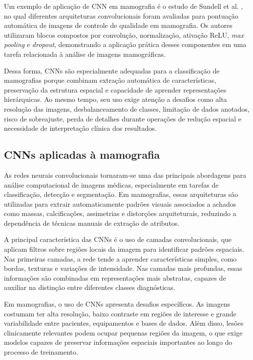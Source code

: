 \documentclass[
    12pt,
    openright,
    oneside,
    a4paper,
    english,
    brazil
]{abntex2}
\begin{document}
Um exemplo de aplicação de CNN em mamografia é o estudo de Sundell et al. \cite{sundell2022cnn}, no qual diferentes arquiteturas convolucionais foram avaliadas para pontuação automática de imagens de controle de qualidade em mamografia. Os autores utilizaram blocos compostos por convolução, normalização, ativação ReLU, \textit{max pooling} e \textit{dropout}, demonstrando a aplicação prática desses componentes em uma tarefa relacionada à análise de imagens mamográficas.

Dessa forma, CNNs são especialmente adequadas para a classificação de mamografias porque combinam extração automática de características, preservação da estrutura espacial e capacidade de aprender representações hierárquicas. Ao mesmo tempo, seu uso exige atenção a desafios como alta resolução das imagens, desbalanceamento de classes, limitação de dados anotados, risco de sobreajuste, perda de detalhes durante operações de redução espacial e necessidade de interpretação clínica dos resultados.

\subsection{CNNs aplicadas à mamografia}

As redes neurais convolucionais tornaram-se uma das principais abordagens para análise computacional de imagens médicas, especialmente em tarefas de classificação, detecção e segmentação. Em mamografias, essas arquiteturas são utilizadas para extrair automaticamente padrões visuais associados a achados como massas, calcificações, assimetrias e distorções arquiteturais, reduzindo a dependência de técnicas manuais de extração de atributos.

A principal característica das CNNs é o uso de camadas convolucionais, que aplicam filtros sobre regiões locais da imagem para identificar padrões espaciais. Nas primeiras camadas, a rede tende a aprender características simples, como bordas, texturas e variações de intensidade. Nas camadas mais profundas, essas informações são combinadas em representações mais abstratas, capazes de auxiliar na distinção entre diferentes classes diagnósticas.

Em mamografias, o uso de CNNs apresenta desafios específicos. As imagens costumam ter alta resolução, baixo contraste em regiões de interesse e grande variabilidade entre pacientes, equipamentos e bases de dados. Além disso, lesões clinicamente relevantes podem ocupar pequenas regiões da imagem, o que exige modelos capazes de preservar informações espaciais importantes ao longo do processo de treinamento.
\end{document}
